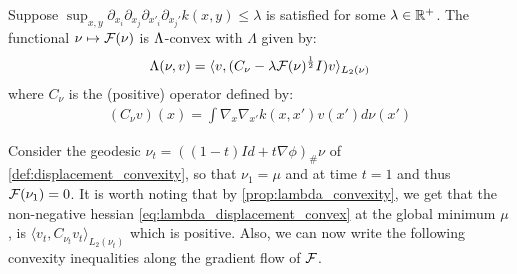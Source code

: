 \begin{proposition}
	\label{prop:lambda_convexity} Suppose $\sup_{x,y} \partial_{x_{i}}\partial_{x_{j}}\partial_{x'_{i}}\partial_{x_{j}'}k(x,y)\le \lambda$ is satisfied for some $\lambda \in {{\mathbb R}}^+$. The functional $\nu\mapsto {{\mathcal F}}(\nu)$ is $\text{\ensuremath{\Lambda}}$-convex
	with $\Lambda$ given by:
	\begin{equation}
	\Lambda(\nu,v)=\langle v,(C_{\nu}-\lambda {{\mathcal F}}(\nu)^{\frac{1}{2}}I)v\rangle_{L_{2}(\nu)}\label{eq:Lambda}
	\end{equation}
	where $C_{\nu}$ is the (positive) operator defined by:
	\begin{align}\label{eq:positive_operator_C}
	(C_{\nu}v)(x)=\int\nabla_{x}\nabla_{x'}k(x,x')v(x')d\nu(x')
	\end{align}
\end{proposition}
%
%
Consider the geodesic $\nu_{t}=((1-t)Id+t\nabla\phi)_{\#}\nu$ of \cref{def:displacement_convexity}, so that $\nu_{1}=\mu$ and at time $t=1$ and thus ${{\mathcal F}}(\nu_{1})=0$. It is worth noting that by \cref{prop:lambda_convexity}, we get that the non-negative hessian \eqref{eq:lambda_displacement_convex} at the global minimum $\mu$, is $\langle v_{t},C_{\nu_{t}}v_{t}\rangle_{L_{2}(\nu_{t})}$ which is positive. Also, we can now write the following convexity inequalities along the gradient flow of ${{\mathcal F}}$.


